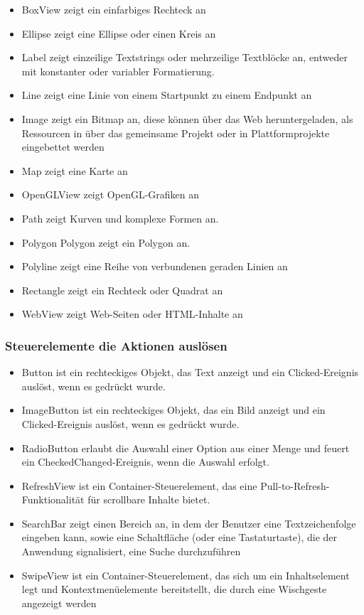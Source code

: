 \begin{itemize}
\setlength\itemsep{-0.6em}
 \item BoxView zeigt ein einfarbiges Rechteck an 
 \item Ellipse zeigt eine Ellipse oder einen Kreis an
  \item Label zeigt einzeilige Textstrings oder mehrzeilige Textblöcke an, entweder mit konstanter oder variabler Formatierung.
 \item Line zeigt eine Linie von einem Startpunkt zu einem Endpunkt an
 \item Image zeigt ein Bitmap an, diese können über das Web heruntergeladen, als Ressourcen in über das gemeinsame Projekt oder in Plattformprojekte eingebettet  werden
 \item Map zeigt eine Karte an
 \item OpenGLView zeigt OpenGL-Grafiken an
 \item Path zeigt Kurven und komplexe Formen an.
 \item Polygon Polygon zeigt ein Polygon an.
 \item  Polyline zeigt eine Reihe von verbundenen geraden Linien an
 \item Rectangle zeigt ein Rechteck oder Quadrat an
 \item WebView zeigt Web-Seiten oder HTML-Inhalte an
\end{itemize}

\subsubsection{Steuerelemente die Aktionen auslösen}

\begin{itemize}
\setlength\itemsep{-0.6em}
 \item Button ist ein rechteckiges Objekt, das Text anzeigt und ein Clicked-Ereignis auslöst, wenn es gedrückt wurde.
 \item ImageButton ist ein rechteckiges Objekt, das ein Bild anzeigt und ein Clicked-Ereignis auslöst, wenn es gedrückt wurde.
  \item RadioButton erlaubt die Auswahl einer Option aus einer Menge und feuert ein CheckedChanged-Ereignis, wenn die Auswahl erfolgt.
 \item RefreshView ist ein Container-Steuerelement, das eine Pull-to-Refresh-Funktionalität für scrollbare Inhalte bietet. 
 \item SearchBar zeigt einen Bereich an, in dem der Benutzer eine Textzeichenfolge eingeben kann, sowie eine Schaltfläche (oder eine Tastaturtaste), die der Anwendung signalisiert, eine Suche durchzuführen
 \item SwipeView ist ein Container-Steuerelement, das sich um ein Inhaltselement legt und Kontextmenüelemente bereitstellt, die durch eine Wischgeste angezeigt werden
\end{itemize}



